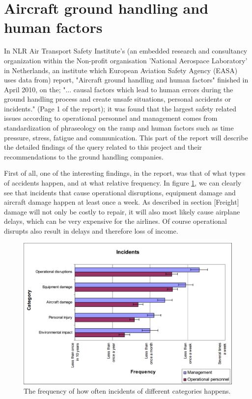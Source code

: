 \section{Aircraft ground handling and human factors}
In NLR Air Transport Safety Institute's (an embedded research and consultancy organization within the Non-profit organisation 'National Aerospace Laboratory' in Netherlands, an institute which European Aviation Safety Agency (EASA) uses data from) report, "Aircraft ground handling and human factors" finished in April 2010, on the; "... causal factors which lead to human errors during the ground handling process and create unsafe situations, personal accidents or incidents." (Page 1 of the report); it was found that the largest safety related issues according to operational personnel and management comes from standardization of phraseology on the ramp and human factors such as time pressure, stress, fatigue and communication. This part of the report will describe the detailed findings of the query related to this project and their recommendations to the ground handling companies.

First of all, one of the interesting findings, in the report, was that of what types of accidents happen, and at what relative frequency. In figure \ref{FrequencyOfIncidents}, we can clearly see that incidents that cause operational disruptions, equipment damage and aircraft damage happen at least once a week. As described in section [Freight] damage will not only be costly to repair, it will also most likely cause airplane delays, which can be very expensive for the airlines. Of course operational disrupts also result in delays and therefore loss of income.

\begin{figure}[H]
\centering
\includegraphics[width=\textwidth]{Grafik/FrequencyOfIncidents}
\caption{The frequency of how often incidents of different categories happens.}
\label{FrequencyOfIncidents}
\end{figure}

